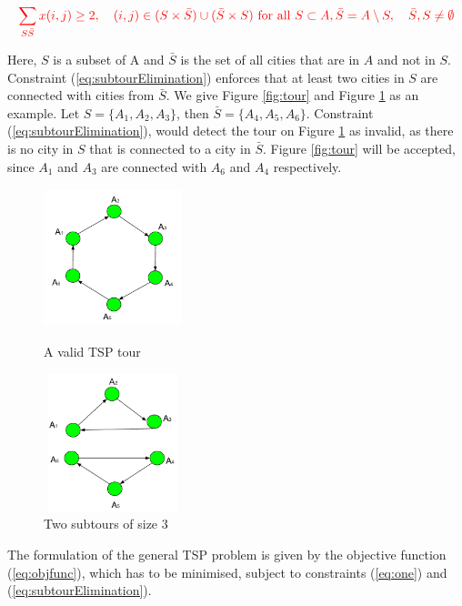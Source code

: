 \documentclass{mprop}
\theoremstyle{definition}
\begin{document}
\begin{equation}
\label{eq:subtourElimination}
\color{red}
\sum_{S\bar{S}} x(i,j) \geq 2, \quad (i,j) \in (S \times \bar{S}) \cup (\bar{S} \times S) \textrm{ for all } S \subset A, \bar{S} = A \setminus S, \quad \bar{S},S \neq \emptyset
\end{equation}

Here, $S$ is a subset of A and $\bar{S}$ is the set of all cities that are in $A$ and not in $S$. Constraint (\ref{eq:subtourElimination}) enforces that at least two cities in $S$ are connected with cities from $\bar{S}$. We give Figure \ref{fig:tour} and Figure \ref{fig:subtours} as an example. Let $S = \{A_{1},A_{2},A_{3}\}$, then $\bar{S} = \{A_{4},A_{5},A_{6}\}$. Constraint (\ref{eq:subtourElimination}), would detect the tour on Figure \ref{fig:subtours} as invalid, as there is no city in $S$ that is connected to a city in $\bar{S}$. Figure \ref{fig:tour} will be accepted, since $A_{1}$ and $A_{3}$ are connected with $A_{6}$ and $A_{4}$ respectively.

\begin{figure}
\centering
\begin{minipage}{.5\textwidth}
  \centering
  \includegraphics[width=4cm, height=4cm]{images/valid.png}
  \caption{A valid TSP tour}
  \label{fig:tour}
\end{minipage}%
\begin{minipage}{.5\textwidth}
  \centering
  \includegraphics[width=4cm, height=4cm]{images/invalid.png}
  \caption{Two subtours of size 3}
  \label{fig:subtours}
\end{minipage}
\end{figure}

The formulation of the general TSP problem is given by the objective function (\ref{eq:objfunc}), which has to be minimised, subject to constraints (\ref{eq:one}) and (\ref{eq:subtourElimination}).
\end{document}
